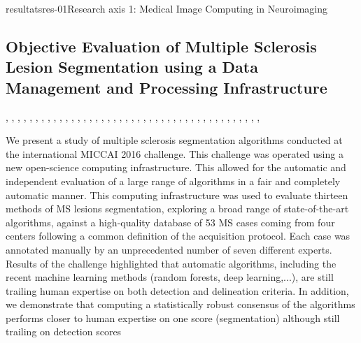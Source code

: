 \documentclass{ra2018}
\begin{document}
\begin{module}{resultats}{res-01}{Research axis 1: Medical Image Computing in Neuroimaging}
\subsection{Objective Evaluation of Multiple Sclerosis Lesion Segmentation using a Data Management and Processing Infrastructure}
\begin{participants}
      ,
      ,
      ,
      ,
      ,
      ,
      ,
      ,
      ,
      ,
      ,
      ,
      ,
      ,
      ,
      ,
      ,
      ,
      ,
      ,
      ,
      ,
      ,
      ,
      ,
      ,
      ,
      ,
      ,
      ,
      ,
      ,
      ,
      ,
      ,
      ,
      ,
      ,
      ,
      ,
      ,
      ,
      ,
\end{participants}
We present a study of multiple sclerosis segmentation algorithms conducted at the international MICCAI 2016 challenge. This challenge was operated using a new open-science computing infrastructure. This allowed for the automatic and independent evaluation of a large range of algorithms in a fair and completely automatic manner. This computing infrastructure was used to evaluate thirteen methods of MS lesions segmentation, exploring a broad range of state-of-the-art algorithms, against a high-quality database of 53 MS cases coming from four centers following a common definition of the acquisition protocol. Each case was annotated manually by an unprecedented number of seven different experts. Results of the challenge highlighted that automatic algorithms, including the recent machine learning methods (random forests, deep learning,...), are still trailing human expertise on both detection and delineation criteria. In addition, we demonstrate that computing a statistically robust consensus of the algorithms performs closer to human expertise on one score (segmentation) although still trailing on detection scores~\cite{commowick:inserm-01847873}


\end{module}
\end{document}

